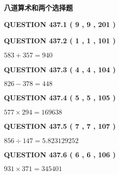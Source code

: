 \documentclass{ctexart}
\begin{document}
   
   
   
 \vspace{0.2in}
{\LARGE {\textbf{ 八道算术和两个选择题}}}
   
   
  
\vspace{0.2in}
  
{\textbf{\Large{QUESTION
437.1 
 ( 9 , 9 , 201 )
}}}
  
  
  
\vspace{0.2in}
  
{\textbf{\Large{QUESTION
437.2 
 ( 1 , 1 , 101 )
}}}
  
  
 
 

$ %
583 +  %
357=   %
940$
 
 
  
\vspace{0.2in}
  
{\textbf{\Large{QUESTION
437.3 
 ( 4 , 4 , 104 )
}}}
  
  
 
 

$ %
826 -  %
378=   %
448$
 
 
  
\vspace{0.2in}
  
{\textbf{\Large{QUESTION
437.4 
 ( 5 , 5 , 105 )
}}}
  
  
 
 

$ %
577 \times  %
294=   %
169638$
 
 
  
\vspace{0.2in}
  
{\textbf{\Large{QUESTION
437.5 
 ( 7 , 7 , 107 )
}}}
  
  
 
 

$ %
856 \div  %
147=   %
5.823129252$
 
 
  
\vspace{0.2in}
  
{\textbf{\Large{QUESTION
437.6 
 ( 6 , 6 , 106 )
}}}
  
  
 
 

$ %
931 \times  %
371=   %
345401$
 
 
  
\vspace{0.2in}
  
\end{document}

